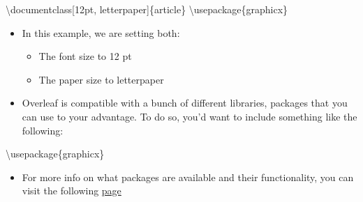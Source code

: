 \documentclass[
  letterpaper,
  DIV=11,
  numbers=noendperiod]{scrartcl}
\newenvironment{Shaded}{\begin{snugshade}}{\end{snugshade}}
\newcommand{\BuiltInTok}[1]{\textcolor[rgb]{0.00,0.23,0.31}{#1}}
\newcommand{\ExtensionTok}[1]{\textcolor[rgb]{0.00,0.23,0.31}{#1}}
\newcommand{\NormalTok}[1]{\textcolor[rgb]{0.00,0.23,0.31}{#1}}
\providecommand{\tightlist}{%
  \setlength{\itemsep}{0pt}\setlength{\parskip}{0pt}}\usepackage{longtable,booktabs,array}
\begin{document}
\begin{codelisting}

\caption{\texttt{Document Settings}}

\begin{Shaded}
\begin{Highlighting}[]
\BuiltInTok{\textbackslash{}documentclass}\NormalTok{[12pt, letterpaper]\{}\ExtensionTok{article}\NormalTok{\}}
\BuiltInTok{\textbackslash{}usepackage}\NormalTok{\{}\ExtensionTok{graphicx}\NormalTok{\}}
\end{Highlighting}
\end{Shaded}

\end{codelisting}

\begin{itemize}
\tightlist
\item
  In this example, we are setting both:

  \begin{itemize}
  \tightlist
  \item
    The {font size} to 12 pt
  \item
    The {paper size} to letterpaper
  \end{itemize}
\end{itemize}

\begin{itemize}
\tightlist
\item
  Overleaf is compatible with a bunch of different libraries, packages
  that you can use to your advantage. To do so, you'd want to include
  something like the following:
\end{itemize}

\begin{codelisting}

\caption{\texttt{Package Import}}

\begin{Shaded}
\begin{Highlighting}[]
\BuiltInTok{\textbackslash{}usepackage}\NormalTok{\{}\ExtensionTok{graphicx}\NormalTok{\}}
\end{Highlighting}
\end{Shaded}

\end{codelisting}

\begin{itemize}
\tightlist
\item
  For more info on what packages are available and their functionality,
  you can visit the following
  \href{https://www.overleaf.com/learn/latex/Learn_LaTeX_in_30_minutes\#Finding_and_using_LaTeX_packages}{page}
\end{itemize}
\end{document}
